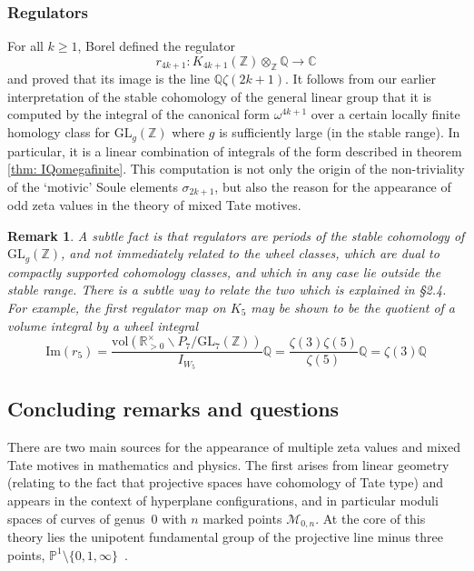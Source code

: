 \documentclass[12pt]{amsart}
\newcommand{\CC}{{\mathbb C}}
\newcommand{\QQ}{{\mathbb Q}}
\newcommand{\RR}{{\mathbb R}}
\newcommand{\ZZ}{{\mathbb Z}}
\theoremstyle{plain}
\newtheorem{remark}[thm]{Remark}
\newcommand{\GL}{\mathrm{GL}}
\newcommand{\To}{\longrightarrow}
\newcommand{\0}{\color{blue}{\mathsf{0}}}
\begin{document}
 
 \subsubsection{Regulators} For all $k\geq 1$,  Borel defined the  regulator
 \[ r_{4k+1} : K_{4k+1}(\ZZ) \otimes_{\ZZ} \QQ \To \CC\] 
and proved that its image is the line $\QQ \zeta(2k+1)$. It follows from our earlier interpretation of the stable cohomology of the general linear group that it is computed by the integral of the canonical form $\omega^{4k+1}$ over a certain locally finite homology class for $\GL_g(\ZZ)$ where $g$ is sufficiently large (in the stable range). In particular, it is a linear combination of integrals of the form described   in theorem \ref{thm: IQomegafinite}.  This computation is  not only the origin of the non-triviality of the `motivic' Soule elements $\sigma_{2k+1}$, but also the reason for the appearance of  odd zeta values in the theory of mixed Tate motives.


 

 \begin{remark}A subtle fact  is that regulators are periods of the \emph{stable} cohomology of $\GL_g(\ZZ)$, and not immediately related to the wheel classes, which are dual to \emph{compactly supported} cohomology classes, and which in any case lie outside the stable range. There is a subtle way to relate the  two which is explained in \cite{BrownSchnetzoneformmatrices} \S2.4. For example, the first regulator map on $K_5$ may be shown to be the quotient of a volume integral by a wheel integral
 \[  \mathrm{Im} (r_5) =  \frac{ \mathrm{vol}(  \RR^{\times}_{>0} \backslash  P_7/\GL_7(\ZZ))}{I_{W_5}} \QQ =\frac{\zeta(3) \zeta(5)}{\zeta(5)} \QQ = \zeta(3)  \QQ \]

 \end{remark}
     
 

 
 
 \subsection{Concluding remarks and  questions}





 
There are two main sources for the appearance of multiple zeta values and mixed Tate motives in mathematics and physics. The first arises from linear geometry (relating to the fact that  projective spaces have  cohomology of Tate type) and appears in the context of hyperplane configurations,  and in particular   moduli spaces of curves of genus~$0$ with $n$ marked points $\mathcal{M}_{0,n}$. At the core of this theory lies the unipotent  fundamental group of the projective line minus three points, $\mathbb{P}^1\setminus \{0,1,\infty\}$~\cite{deligneP1}.
\end{document}
